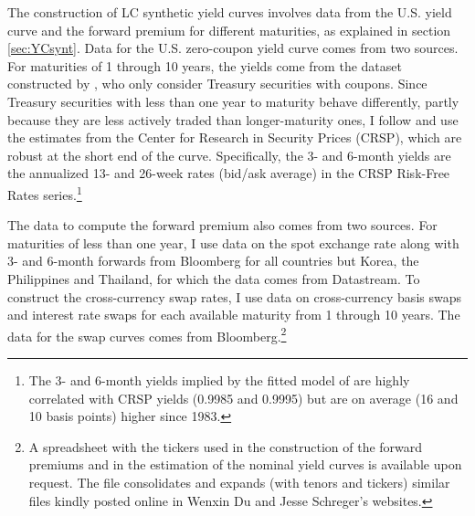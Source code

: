 {The construction of LC synthetic yield curves involves data from the U.S. yield curve and the forward premium for different maturities, as explained in section \ref{sec:YCsynt}. 
Data for the U.S. zero-coupon yield curve comes from two sources. 
For maturities of 1 through 10 years, the yields come from the dataset constructed by \cite{GSW:2007}, who only consider Treasury securities with coupons.%
Since Treasury securities with less than one year to maturity behave differently, partly because  
they are less actively traded than longer-maturity ones, 
I follow \cite{Duffee:2010} and use the estimates from the Center for Research in Security Prices (CRSP), which are %
robust at the short end of the curve.
Specifically, the 3- and 6-month yields are the annualized 13- and 26-week rates (bid/ask average) in the CRSP Risk-Free Rates series.\footnote{ The 3- and 6-month yields implied by the fitted model of \cite{GSW:2007} are highly correlated with CRSP yields (0.9985 and 0.9995) but are on average (16 and 10 basis points) higher since 1983.} %

The data to compute the forward premium also comes from two sources.
For maturities of less than one year, I use data on the spot exchange rate along with 3- and 6-month forwards from Bloomberg for all countries but Korea, the Philippines and Thailand, for which the data comes from Datastream.
To construct the cross-currency swap rates, I use data on cross-currency basis swaps and interest rate swaps for each available maturity from 1 through 10 years. 
The data for the swap curves comes from Bloomberg.\footnote{A spreadsheet with the tickers used in the construction of the forward premiums and in the estimation of the nominal yield curves is available upon request. The file consolidates and expands (with tenors and tickers) similar files kindly posted online in Wenxin Du and Jesse Schreger's websites.}

}
